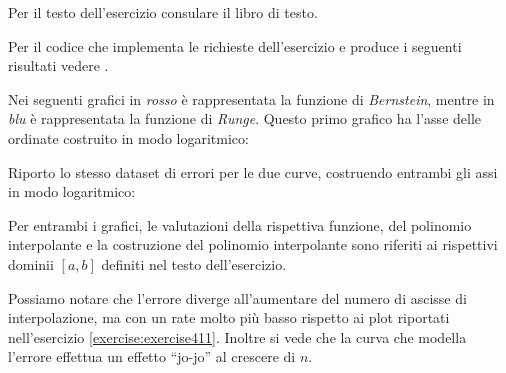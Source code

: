 \begin{exercise}[4.15]
Per il testo dell'esercizio consulare il libro di testo.
\end{exercise}
Per il codice che implementa le richieste dell'esercizio e produce i seguenti
risultati vedere .

Nei seguenti grafici in
\emph{rosso} \`e rappresentata la funzione di \emph{Bernstein}, mentre in 
\emph{blu} \`e rappresentata la funzione di \emph{Runge}. Questo primo grafico
ha l'asse delle ordinate costruito in modo logaritmico:
\begin{center}   

\end{center}
Riporto lo stesso dataset di errori per le due curve, costruendo entrambi gli
assi in modo logaritmico:
\begin{center}  

\end{center}
Per entrambi i grafici, le valutazioni della rispettiva funzione, del polinomio
interpolante e la costruzione del polinomio interpolante sono riferiti ai
rispettivi dominii $[a,b]$ definiti nel testo dell'esercizio. 

Possiamo notare che l'errore diverge all'aumentare del numero di ascisse di
interpolazione, ma con un rate molto pi\`u basso rispetto ai plot riportati
nell'esercizio \ref{exercise:exercise411}. Inoltre si vede che la curva
che modella l'errore effettua un effetto ``jo-jo'' al crescere di $n$.
